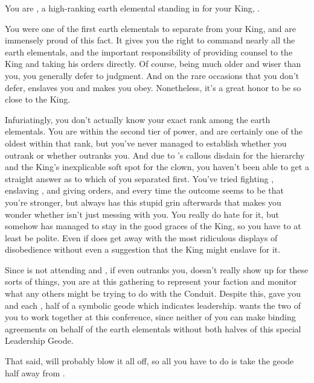 \documentclass[char]{elementals}
\begin{document}
\name{\cLoyal{}}

You are \cLoyal{\intro}, a high-ranking earth elemental standing in for your King, \cEarthKing{}.

You were one of the first earth elementals to separate from your King, and are immensely proud of this fact.  It gives you the right to command nearly all the earth elementals, and the important responsibility of providing counsel to the King and taking his orders directly.  Of course, \cEarthKing{\they} being much older and wiser than you, you generally defer to \cEarthKing{\their} judgment.  And on the rare occasions that you don't defer, \cEarthKing{\they} enslaves you and makes you obey.  Nonetheless, it's a great honor to be so close to the King.

Infuriatingly, you don't actually know your exact rank among the earth elementals.  You are within the second tier of power, and are certainly one of the oldest within that rank, but you've never managed to establish whether you outrank \cRogue{\intro} or whether \cRogue{\they} outranks you.  And due to \cRogue{}'s callous disdain for the hierarchy and the King's inexplicable soft spot for the clown, you haven't been able to get a straight answer as to which of you separated first.  You've tried fighting \cRogue{}, enslaving \cRogue{\them}, and giving \cRogue{\them} orders, and every time the outcome seems to be that you're stronger, but \cRogue{\they} always has this stupid grin afterwards that makes you wonder whether \cRogue{\they} isn't just messing with you.  You really do hate \cRogue{\them} for it, but somehow \cRogue{\they} has managed to stay in the good graces of the King, so you have to at least be polite.  Even if \cRogue{\they} does get away with the most ridiculous displays of disobedience without even a suggestion that the King might enslave \cRogue{\them} for it.

Since \cEarthKing{} is not attending and \cRogue{}, if \cRogue{\they} even outranks you, doesn't really show up for these  sorts of things, you are at this gathering to represent your faction and monitor what any others might be trying to do with the Conduit.  Despite this, \cEarthKing{} gave you and \cRogue{} each \iHalfGeode{}, half of a symbolic geode which indicates leadership.  \cEarthKing{} wants the two of you to work together at this conference, since neither of you can make binding agreements on behalf of the earth elementals without both halves of this special Leadership Geode.

That said, \cRogue{} will probably blow it all off, so all you have to do is take the geode half away from \cRogue{\them}.
\end{document}
